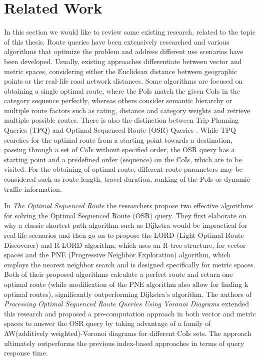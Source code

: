 \chapter{Related Work}
\label{sec:relwork}
In this section we would like to review some existing research, related to the topic of this thesis. Route queries have been extensively researched and various algorithms that optimize the problem and address different use scenarios have been developed. Usually, existing approaches differentiate between vector and metric spaces, considering either the Euclidean distance between geographic points or the real-life road network distances. Some algorithms are focused on obtaining a single optimal route, where the PoIs match the given CoIs in the category sequence perfectly, whereas others consider semantic hierarchy or multiple route factors such as rating, distance and category weights and retrieve multiple possible routes. There is also the distinction between Trip Planning Queries (TPQ) \cite{tpq} and Optimal Sequenced Route (OSR) Queries  \cite{OSR}. While TPQ searches for the optimal route from a starting point towards a destination, passing through a set of CoIs without specified order, the OSR query has a starting point and a predefined order (sequence) on the CoIs, which are to be visited. For the obtaining of optimal route, different route parameters may be considered such as route length, travel duration, ranking of the PoIs or dynamic traffic information.

In \textit{The Optimal Sequenced Route} \cite{OSR} the researchers propose two effective algorithms for solving the Optimal Sequenced Route (OSR) query. They first elaborate on why a classic shortest path algorithm such as Dijkstra would be impractical for real-life scenarios and then go on to propose the LORD (Light Optimal Route Discoverer) and R-LORD algorithm, which uses an R-tree structure, for vector spaces and the PNE (Progressive Neighbor Exploration) algorithm, which employs the nearest neighbor search and is designed specifically for metric spaces. Both of their proposed algorithms calculate a perfect route and return one optimal route (while modification of the PNE algorithm also allow for finding k optimal routes), significantly outperforming Dijkstra's algorithm. The authors of \textit{Processing Optimal Sequenced Route Queries Using Voronoi Diagrams} \cite{voronoi} extended this research and proposed a pre-computation approach in both vector and metric spaces to answer the OSR query by taking advantage of a family of AW(additively weighted)-Voronoi diagrams for different CoIs sets. The approach ultimately outperforms the previous index-based approaches in terms of query response time.

